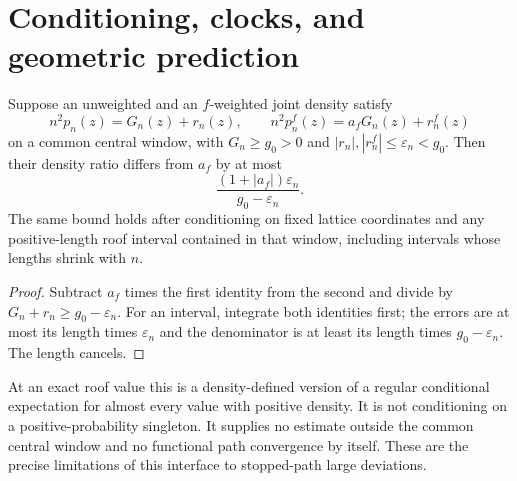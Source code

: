 \section{Conditioning, clocks, and geometric prediction}
\begin{proposition}\label{prop:conditioning}
Suppose an unweighted and an $f$-weighted joint density satisfy
\[
 n^2p_n(z)=G_n(z)+r_n(z),\qquad
 n^2p_n^f(z)=a_fG_n(z)+r_n^f(z)
\]
on a common central window, with $G_n\ge g_0>0$ and $|r_n|,|r_n^f|\le\varepsilon_n<g_0$. Then their density ratio differs from $a_f$ by at most
\begin{equation}\label{eq:ratio}
          \frac{(1+|a_f|)\varepsilon_n}{g_0-\varepsilon_n}.
\end{equation}
The same bound holds after conditioning on fixed lattice coordinates and any positive-length roof interval contained in that window, including intervals whose lengths shrink with $n$.
\end{proposition}
\begin{proof}
Subtract $a_f$ times the first identity from the second and divide by $G_n+r_n\ge g_0-\varepsilon_n$. For an interval, integrate both identities first; the errors are at most its length times $\varepsilon_n$ and the denominator is at least its length times $g_0-\varepsilon_n$. The length cancels.
\end{proof}
At an exact roof value this is a density-defined version of a regular conditional expectation for almost every value with positive density. It is not conditioning on a positive-probability singleton. It supplies no estimate outside the common central window and no functional path convergence by itself. These are the precise limitations of this interface to stopped-path large deviations.

